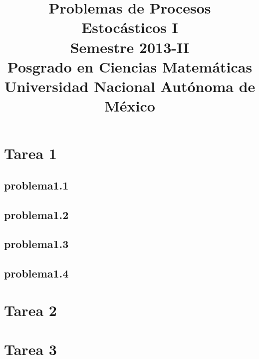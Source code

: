 \documentclass[a5paper,oneside]{amsart}
\title[Problemas de Procesos I]{Problemas de Procesos Estocásticos I\\ Semestre 2013-II\\ Posgrado en Ciencias Matemáticas\\ Universidad Nacional Autónoma de México}
\theoremstyle{dotless}
\begin{document}
	\maketitle
	\section{Tarea 1}
	\nqed
		\subsection{problema1.1}
		
		
		\subsection{problema1.2}
		
		
		\subsection{problema1.3}
		
		
		\subsection{problema1.4}
		
		\nqed
		
	\section{Tarea 2}

		
		\nqed
		
	\section{Tarea 3}

		

		
	
	
\end{document}
